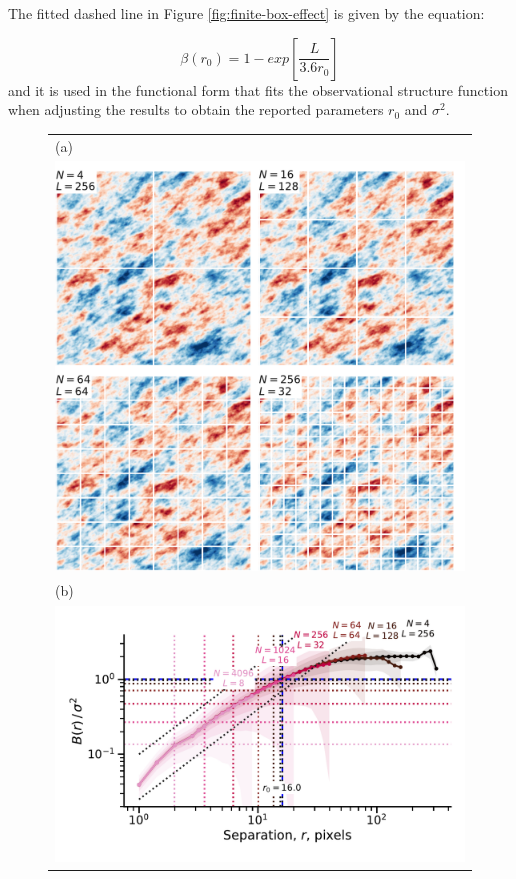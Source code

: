 \documentclass[fleqn,usenatbib, useAMS, a4paper]{mnras}
\begin{document}
The fitted dashed line in Figure \ref{fig:finite-box-effect} is given by the equation: 

\begin{equation}\label{eq:ajustebox}
\beta(r_0) = 1 - exp \left[ \frac{L}{3.6r_0} \right] 
\end{equation}
%
and it is used in the functional form that fits the observational structure function when adjusting the results to obtain the reported parameters \(r_0\) and \(\sigma^2 \). 

\begin{figure}
  \begin{tabular}{@{} l @{}}
    (a)\\
    \includegraphics[width=\linewidth]{Figures/fake-finite-box-images}
    \\[\bigskipamount]
    (b)\\
    \includegraphics[width=\linewidth]{Figures/fake-finite-box-strucfunc2}

\end{tabular}
\end{figure}
\end{document}
